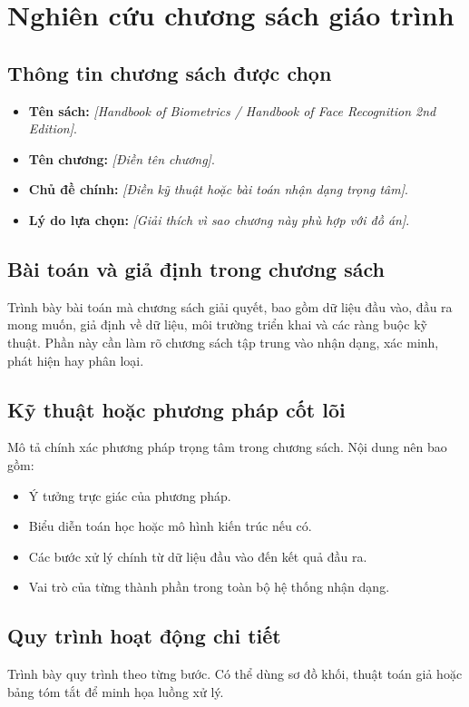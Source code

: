 \section{Nghiên cứu chương sách giáo trình}

\subsection{Thông tin chương sách được chọn}
\begin{itemize}
    \item \textbf{Tên sách:} \textit{[Handbook of Biometrics / Handbook of Face Recognition 2nd Edition]}.
    \item \textbf{Tên chương:} \textit{[Điền tên chương]}.
    \item \textbf{Chủ đề chính:} \textit{[Điền kỹ thuật hoặc bài toán nhận dạng trọng tâm]}.
    \item \textbf{Lý do lựa chọn:} \textit{[Giải thích vì sao chương này phù hợp với đồ án]}.
\end{itemize}

\subsection{Bài toán và giả định trong chương sách}
Trình bày bài toán mà chương sách giải quyết, bao gồm dữ liệu đầu vào, đầu ra mong muốn, giả định về dữ liệu, môi trường triển khai và các ràng buộc kỹ thuật. Phần này cần làm rõ chương sách tập trung vào nhận dạng, xác minh, phát hiện hay phân loại.

\subsection{Kỹ thuật hoặc phương pháp cốt lõi}
Mô tả chính xác phương pháp trọng tâm trong chương sách. Nội dung nên bao gồm:
\begin{itemize}
    \item Ý tưởng trực giác của phương pháp.
    \item Biểu diễn toán học hoặc mô hình kiến trúc nếu có.
    \item Các bước xử lý chính từ dữ liệu đầu vào đến kết quả đầu ra.
    \item Vai trò của từng thành phần trong toàn bộ hệ thống nhận dạng.
\end{itemize}

\subsection{Quy trình hoạt động chi tiết}
Trình bày quy trình theo từng bước. Có thể dùng sơ đồ khối, thuật toán giả hoặc bảng tóm tắt để minh họa luồng xử lý.


